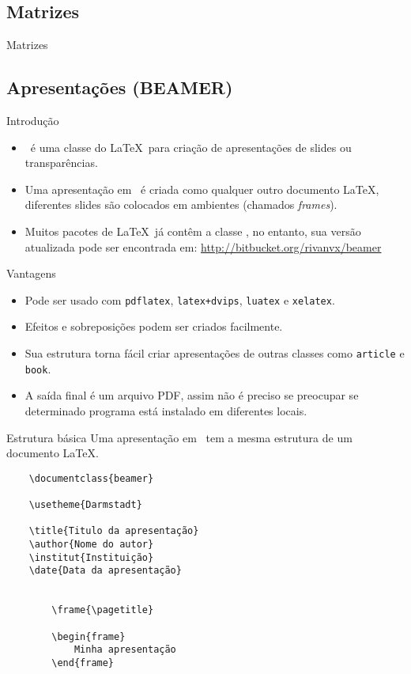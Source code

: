 \subsection{Matrizes}
\begin{frame}{Matrizes}

\end{frame}

\subsection{Apresentações (BEAMER)}

\begin{frame}[fragile]{Introdução}
    \begin{itemize}
    \item \beamer\ é uma classe do \LaTeX\ para criação de apresentações de slides ou transparências.
    \item Uma apresentação em \beamer\ é criada como qualquer outro documento \LaTeX, diferentes slides são colocados em ambientes (chamados \textit{frames}).
    \item Muitos pacotes de \LaTeX\ já contêm a classe \beamer, no entanto, sua versão atualizada pode ser encontrada em: \url{http://bitbucket.org/rivanvx/beamer}
    \end{itemize}
\end{frame}

\begin{frame}[fragile]{Vantagens}
    \begin{itemize}
    \item Pode ser usado com \verb|pdflatex|, \verb|latex+dvips|, \verb|luatex| e \verb|xelatex|.
    \item Efeitos e sobreposições podem ser criados facilmente.
    \item Sua estrutura torna fácil criar apresentações de outras classes como \verb|article| e \verb|book|.
    \item A saída final é um arquivo PDF, assim não é preciso se preocupar se determinado programa está instalado em diferentes locais.
    \end{itemize}
\end{frame}

\begin{frame}[fragile]{Estrutura básica}
    Uma apresentação em \beamer\ tem a mesma estrutura de um documento \LaTeX.
    
{\footnotesize
\begin{verbatim}
    \documentclass{beamer}

    \usetheme{Darmstadt}

    \title{Titulo da apresentação}
    \author{Nome do autor}
    \institut{Instituição}
    \date{Data da apresentação}

    
        \frame{\pagetitle}

        \begin{frame}
            Minha apresentação
        \end{frame}
    
\end{verbatim}
}
\end{frame}

